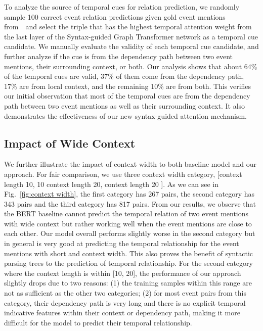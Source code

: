 To analyze the source of temporal cues for relation prediction, we randomly sample 100 correct event relation predictions given gold event mentions from~\matres~and select the triple that has the highest temporal attention weight from the last layer of the Syntax-guided Graph Transformer network as a temporal cue candidate. We manually evaluate the validity of each temporal cue candidate, and further analyze if the cue is from the dependency path between two event mentions, their surrounding context, or both. Our analysis shows that about 64\% of the temporal cues are valid, 37\% of them come from the dependency path, 17\% are from local context, and the remaining 10\% are from both. This verifies our initial observation that most of the temporal cues are from the dependency path between two event mentions as well as their surrounding context. It also demonstrates the effectiveness of our new syntax-guided attention mechanism. 











\subsection{Impact of Wide Context}




We further illustrate the impact of context width to both baseline model and our approach. For fair comparison, we use three context width category, [context length  10, 10  context length  20, context length  20 ]. As we can see in Fig.~\ref{fig:context width}, the first category has 267 pairs, the second category has 343 pairs and the third category has 817 pairs. From our results, we observe that the BERT baseline cannot predict the temporal relation of two event mentions with wide context but rather working well when the event mentions are close to each other. Our model overall performs slightly worse in the second category but in general is very good at predicting the temporal relationship for the event mentions with short and context width. This also proves the benefit of syntactic parsing trees to the prediction of temporal relationship. For the second category where the context length is within [10, 20], the performance of our approach slightly drops due to two reasons: (1) the training samples within this range are not as sufficient as the other two categories; (2) for most event pairs from this category, their dependency path is very
long and there is no explicit temporal indicative features within their context or dependency path, making it more difficult for the model to predict their temporal relationship.

